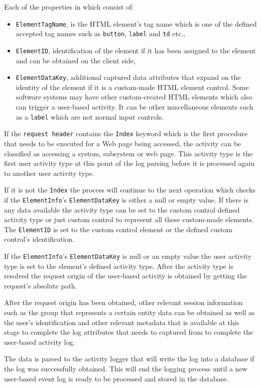 Each of the properties in  which consist of:

\begin{itemize}
	\item \texttt{ElementTagName}, is the HTML element's tag name which is one of the defined accepted tag names such as \texttt{button}, \texttt{label} and \texttt{td} etc.,
	\item \texttt{ElementID}, identification of the element if it has been assigned to the element and can be obtained on the client side,
	\item \texttt{ElementDataKey}, additional captured data attributes that expand on the identity of the element if it is a custom-made HTML element control. Some software systems may have other custom-created HTML elements which also can trigger a user-based activity. It can be other miscellaneous elements such as a \texttt{label} which are not normal input controls.
\end{itemize}



If the \texttt{request header} contains the \texttt{Index} keyword which is the first procedure that needs to be executed for a Web page being accessed, the activity can be classified as accessing a system, subsystem or web page. This activity type is the first user activity type at this point of the log parsing before it is processed again to another user activity type. \par If it is not the \texttt{Index} the process will continue to the next operation which checks if the \texttt{ElementInfo}'s \texttt{ElementDataKey} is either a null or empty value. If there is any data available the activity type can be set to the custom control defined activity type or just custom control to represent all these custom-made elements. The \texttt{ElementID} is set to the custom control element or the defined custom control's identification. \par If the \texttt{ElementInfo}'s \texttt{ElementDataKey} is null or an empty value the user activity type is set to the element's defined activity type. After the activity type is resolved the request origin of the user-based activity is obtained by getting the request's absolute path.\par After the request origin has been obtained, other relevant session information such as the group that represents a certain entity data can be obtained as well as the user's identification and other relevant metadata that is available at this stage to complete the log attributes that needs to captured from  to complete the user-based activity log.\par The data is parsed to the activity logger that will write the log into a database if the log was successfully obtained. This will end the logging process until a new user-based event log is ready to be processed and stored in the database.

